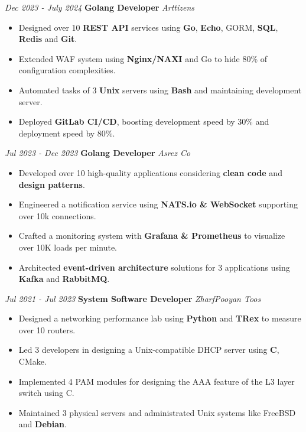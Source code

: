 \documentclass{engineercv}
\begin{document}
\begin{twocolentry}{\textit{Dec 2023 - July 2024}}
  \textbf{Golang Developer}
  \textit{Arttizens}
\end{twocolentry}

\begin{itemize}
  \item Designed over 10 \textbf{REST API} services using \textbf{Go}, \textbf{Echo}, GORM, \textbf{SQL}, \textbf{Redis} and \textbf{Git}.
  \item Extended WAF system using \textbf{Nginx/NAXI} and Go to hide 80\% of configuration complexities.
  \item Automated tasks of 3 \textbf{Unix} servers using \textbf{Bash} and maintaining development server.
  \item Deployed \textbf{GitLab CI/CD}, boosting development speed by 30\% and deployment speed by 80\%.
\end{itemize}

\begin{twocolentry}{\textit{Jul 2023 - Dec 2023}}
  \textbf{Golang Developer}
  \textit{Asrez Co}
\end{twocolentry}

\begin{itemize}
  \item Developed over 10 high-quality applications considering \textbf{clean code} and \textbf{design patterns}.
  \item Engineered a notification service using \textbf{NATS.io \& WebSocket} supporting over 10k connections.
  \item Crafted a monitoring system with \textbf{Grafana \& Prometheus} to visualize over 10K loads per minute.
  \item Architected \textbf{event-driven architecture} solutions for 3 applications using \textbf{Kafka} and \textbf{RabbitMQ}.
\end{itemize}

\begin{twocolentry}{\textit{Jul 2021 - Jul 2023}}
  \textbf{System Software Developer}
  \textit{ZharfPooyan Toos}
\end{twocolentry}

\begin{itemize}
  \item Designed a networking performance lab using \textbf{Python} and \textbf{TRex} to measure over 10 routers.
  \item Led 3 developers in designing a Unix-compatible DHCP server using \textbf{C}, CMake.
  \item Implemented 4 PAM modules for designing the AAA feature of the L3 layer switch using C.
  \item Maintained 3 physical servers and administrated Unix systems like FreeBSD and \textbf{Debian}.
\end{itemize}
\end{document}
